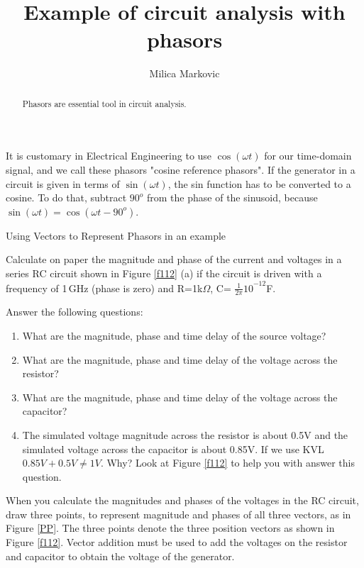 \documentclass{ximera}
\title{Example of circuit analysis with phasors}
\author{Milica Markovic}
\begin{document}
  
\begin{abstract}  
Phasors are essential tool in circuit analysis.
\end{abstract}  
\maketitle    


It is customary in Electrical Engineering to use  $\cos( \omega t)$ for our time-domain signal, and we call these phasors "cosine reference phasors".  If the generator in a circuit is given in terms of $\sin (\omega t)$, the sin function has to be converted to a cosine. To do that, subtract $90^o$ from the phase of the sinusoid, because $\sin( \omega t) = \cos(\omega t - 90^o)$.

\begin{example}
Using Vectors to Represent Phasors in an example


 Calculate on paper the magnitude  and phase of the current and voltages in a series RC circuit shown in Figure \ref{f112} (a) if the circuit is driven with a frequency of 1\,GHz (phase is zero) and R=1k$\Omega $, C= ${\frac{1}{2\pi }10}^{-12}$F. 
 
 
 Answer the following questions:

\begin{enumerate}
\item  What are the magnitude, phase and time delay of the source voltage?

\item  What are the magnitude, phase and time delay of the voltage across the resistor?

\item  What are the magnitude, phase and time delay of the voltage across the capacitor?

\item  The simulated voltage magnitude across the resistor is about 0.5V and the simulated voltage across the capacitor is about 0.85V.  If we use KVL $ 0.85V+0.5V \neq 1V$. Why? Look at Figure \ref{f112} to help you with answer this question.

\end{enumerate}
\begin{explanation} 
 
 
  When you calculate the magnitudes and phases of the voltages in the RC circuit, draw three points, to represent magnitude and phases of all three vectors, as in Figure \ref{PP}. The three points denote the three position vectors as shown in Figure \ref{f112}. Vector addition must be used to add the voltages on the resistor and capacitor to obtain the voltage of the generator. 







\end{explanation}
\end{example}
\end{document}
